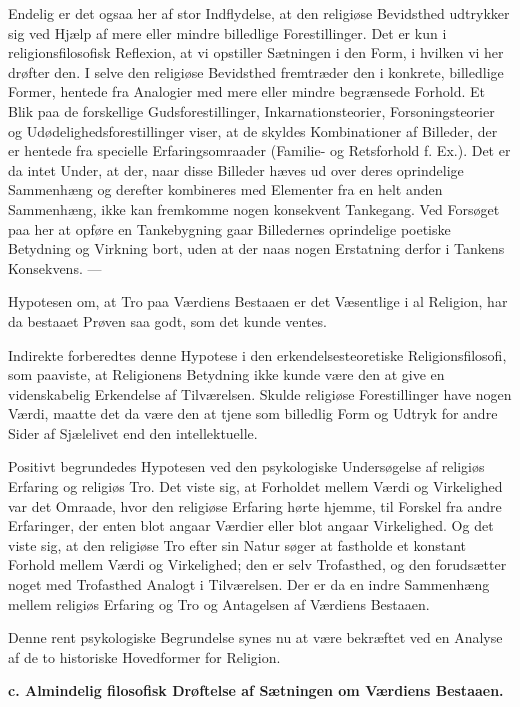 \documentclass[12pt,a4paper,openany]{book}
\newcommand{\opage}[1]{\marginnote{\footnotesize\textit{[#1]}}}
\begin{document}
Endelig er det ogsaa her af stor Indflydelse, at den religiøse
Bevidsthed udtrykker sig ved Hjælp af mere eller mindre billedlige
Forestillinger. Det er kun i religionsfilosofisk Reflexion, at vi
opstiller Sætningen i den Form, i hvilken vi her drøfter den. I selve
den religiøse Bevidsthed fremtræder den i konkrete, billedlige Former,
hentede fra Analogier med mere eller mindre begrænsede Forhold. Et Blik
paa de forskellige Gudsforestillinger, Inkarnationsteorier,
Forsoningsteorier og Udødelighedsforestillinger viser, at de skyldes
Kombinationer af Billeder, der er hentede fra specielle
Erfaringsomraader (Familie- og Retsforhold f. Ex.). Det er da intet
Under, at der, naar disse Billeder hæves ud over deres oprindelige
Sammenhæng og derefter kombineres med Elementer fra en helt anden
Sammenhæng, ikke kan fremkomme nogen konsekvent Tankegang. Ved Forsøget
paa her at opføre en Tankebygning gaar Billedernes oprindelige poetiske
Betydning og Virkning bort, uden at der naas nogen Erstatning derfor i
Tankens Konsekvens. ---

Hypotesen om, at Tro paa Værdiens Bestaaen er det Væsentlige i al
Religion, har da bestaaet Prøven saa godt, som det kunde ventes.

\opage{165}Indirekte forberedtes denne Hypotese i den
erkendelsesteoretiske Religionsfilosofi, som paaviste, at Religionens
Betydning ikke kunde være den at give en videnskabelig Erkendelse af
Tilværelsen. Skulde religiøse Forestillinger have nogen Værdi, maatte
det da være den at tjene som billedlig Form og Udtryk for andre Sider af
Sjælelivet end den intellektuelle.

Positivt begrundedes Hypotesen ved den psykologiske Undersøgelse af
religiøs Erfaring og religiøs Tro. Det viste sig, at Forholdet mellem
Værdi og Virkelighed var det Omraade, hvor den religiøse Erfaring hørte
hjemme, til Forskel fra andre Erfaringer, der enten blot angaar Værdier
eller blot angaar Virkelighed. Og det viste sig, at den religiøse Tro
efter sin Natur søger at fastholde et konstant Forhold mellem Værdi og
Virkelighed; den er selv Trofasthed, og den forudsætter noget med
Trofasthed Analogt i Tilværelsen. Der er da en indre Sammenhæng mellem
religiøs Erfaring og Tro og Antagelsen af Værdiens Bestaaen.

Denne rent psykologiske Begrundelse synes nu at være bekræftet ved en
Analyse af de to historiske Hovedformer for Religion.

\begin{center}\textbf{c. Almindelig filosofisk Drøftelse af Sætningen om Værdiens Bestaaen.}\end{center}
\end{document}

